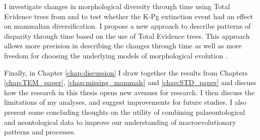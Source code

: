 I investigate changes in morphological diversity \citep[or disparity;][]{Wills1994} through time using Total Evidence trees from \cite{Slater2012MEE} and \cite{beckancient2014} to test whether the K-Pg extinction event had an effect on mammalian diversification.
I propose a new approach to describe patterns of disparity through time based on the use of Total Evidence trees.
This approach allows more precision in describing the changes through time as well as more freedom for choosing the underlying models of morphological evolution \citep[e.g. punctuated or gradual;][]{Hunt21042015}.

Finally, in Chapter \ref{chap:discussion} I draw together the results from Chapters \ref{chap:TEM_paper}, \ref{chap:missing_mammals} and \ref{chap:STD_paper} and discuss how the research in this thesis opens new avenues for research.
I then discuss the limitations of my analyses, and suggest improvements for future studies.
I also present some concluding thoughts on the utility of combining palaeontological and neontological data to improve our understanding of macroevolutionary patterns and processes.

%
